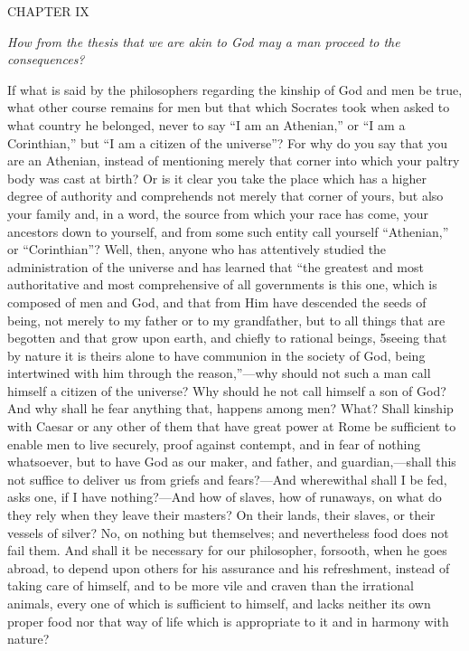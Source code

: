CHAPTER IX

\emph{How from the thesis that we are akin to God may a man proceed to the consequences?}

If what is said by the philosophers regarding the kinship of God and men be true, what other course remains for men but that which Socrates took when asked to what country he belonged, never to say ``I am an Athenian,'' or ``I am a Corinthian,'' but ``I am a citizen of the universe''? For why do you say that you are an Athenian, instead of mentioning merely that corner into which your paltry body was cast at birth? Or is it clear you take the place which has a higher degree of authority and comprehends not merely that corner of yours, but also your family and, in a word, the source from which your race has come, your ancestors down to yourself, and from some such entity call yourself ``Athenian,'' or ``Corinthian''? Well, then, anyone who has attentively studied the administration of the universe and has learned that ``the greatest and most authoritative and most comprehensive of all governments is this one, which is composed of men and God, and that from Him have descended the seeds of being, not merely to my father or to my grandfather, but to all things that are begotten and that grow upon earth, and chiefly to rational beings, 5seeing that by nature it is theirs alone to have communion in the society of God, being intertwined with him through the reason,''—why should not such a man call himself a citizen of the universe? Why should he not call himself a son of God? And why shall he fear anything that, happens among men? What? Shall kinship with Caesar or any other of them that have great power at Rome be sufficient to enable men to live securely, proof against contempt, and in fear of nothing whatsoever, but to have God as our maker, and father, and guardian,—shall this not suffice to deliver us from griefs and fears?—And wherewithal shall I be fed, asks one, if I have nothing?—And how of slaves, how of runaways, on what do they rely when they leave their masters? On their lands, their slaves, or their vessels of silver? No, on nothing but themselves; and nevertheless food does not fail them. And shall it be necessary for our philosopher, forsooth, when he goes abroad, to depend upon others for his assurance and his refreshment, instead of taking care of himself, and to be more vile and craven than the irrational animals, every one of which is sufficient to himself, and lacks neither its own proper food nor that way of life which is appropriate to it and in harmony with nature?

